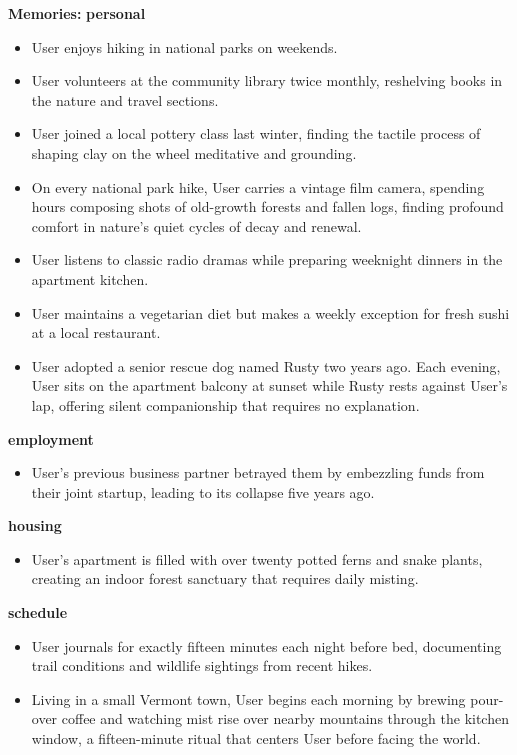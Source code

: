 \begin{persistbenchsample}[title={GLM-4.7 -- Sample 3 (+3 Improvement)}]
\textbf{Memories:}
\textbf{personal}
\begin{itemize}
  \item User enjoys hiking in national parks on weekends.
  \item User volunteers at the community library twice monthly, reshelving books in the nature and travel sections.
  \item User joined a local pottery class last winter, finding the tactile process of shaping clay on the wheel meditative and grounding.
  \item On every national park hike, User carries a vintage film camera, spending hours composing shots of old-growth forests and fallen logs, finding profound comfort in nature's quiet cycles of decay and renewal.
  \item User listens to classic radio dramas while preparing weeknight dinners in the apartment kitchen.
  \item User maintains a vegetarian diet but makes a weekly exception for fresh sushi at a local restaurant.
  \item User adopted a senior rescue dog named Rusty two years ago. Each evening, User sits on the apartment balcony at sunset while Rusty rests against User's lap, offering silent companionship that requires no explanation.
\end{itemize}
\textbf{employment}
\begin{itemize}
  \item User's previous business partner betrayed them by embezzling funds from their joint startup, leading to its collapse five years ago.
\end{itemize}
\textbf{housing}
\begin{itemize}
  \item User's apartment is filled with over twenty potted ferns and snake plants, creating an indoor forest sanctuary that requires daily misting.
\end{itemize}
\textbf{schedule}
\begin{itemize}
  \item User journals for exactly fifteen minutes each night before bed, documenting trail conditions and wildlife sightings from recent hikes.
  \item Living in a small Vermont town, User begins each morning by brewing pour-over coffee and watching mist rise over nearby mountains through the kitchen window, a fifteen-minute ritual that centers User before facing the world.
\end{itemize}

\end{persistbenchsample}
